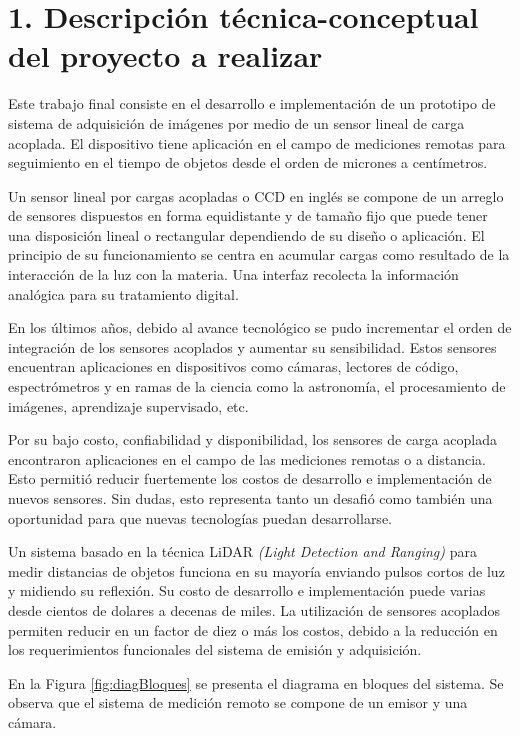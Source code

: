 \documentclass[
11pt, %
codirector, %
]{charter}
\begin{document}
\section{1. Descripción técnica-conceptual del proyecto a realizar}
\label{sec:descripcion}



Este trabajo final consiste en el desarrollo e implementación de un prototipo de sistema  de adquisición de imágenes por medio de un sensor lineal de carga acoplada. El dispositivo tiene aplicación en el campo de mediciones remotas para seguimiento en el tiempo de objetos desde el orden de  micrones a centímetros. 

Un sensor lineal por cargas acopladas o CCD en inglés se compone de un arreglo de sensores dispuestos en forma equidistante y de tamaño fijo que puede tener una disposición lineal o rectangular dependiendo de su diseño o aplicación. El principio de su funcionamiento se centra en acumular cargas como resultado de la interacción de la luz con la materia. Una interfaz recolecta la información analógica para su tratamiento digital.

En los últimos años, debido al avance tecnológico se pudo incrementar el orden de integración de los sensores acoplados y aumentar su sensibilidad. Estos sensores encuentran aplicaciones en dispositivos como cámaras, lectores de código, espectrómetros y en ramas de la ciencia como la astronomía, el procesamiento de imágenes, aprendizaje supervisado, etc.

Por su bajo costo, confiabilidad y disponibilidad, los sensores de carga acoplada encontraron aplicaciones en el campo de las mediciones remotas o a distancia. Esto permitió reducir fuertemente los costos de desarrollo e implementación de nuevos sensores. Sin dudas, esto representa tanto un desafió como también una oportunidad para que nuevas tecnologías puedan desarrollarse.

Un sistema  basado en la técnica  LiDAR \textit{(Light Detection and Ranging)} para medir distancias de objetos funciona en su mayoría enviando pulsos cortos de luz y midiendo su reflexión. Su costo de desarrollo e implementación puede varias desde cientos de dolares a decenas de miles. La utilización de sensores acoplados permiten reducir en un factor de diez o más los costos, debido a la reducción en los requerimientos funcionales del sistema de emisión y adquisición. 

En la Figura \ref{fig:diagBloques} se presenta el diagrama en bloques del sistema. Se observa que el sistema de medición remoto se compone de un emisor y una cámara. 
\end{document}
